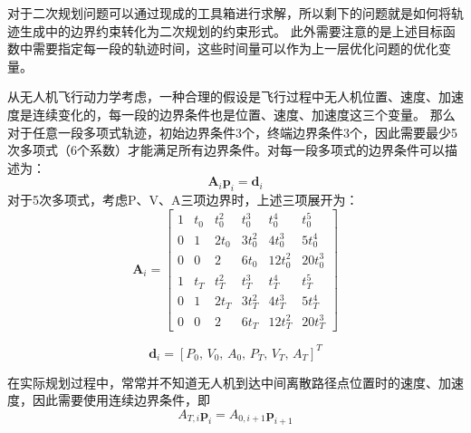 对于二次规划问题可以通过现成的工具箱进行求解，所以剩下的问题就是如何将轨迹生成中的边界约束转化为二次规划的约束形式。
{\color{red}此外需要注意的是上述目标函数中需要指定每一段的轨迹时间，这些时间量可以作为上一层优化问题的优化变量。}

从无人机飞行动力学考虑，一种合理的假设是飞行过程中无人机位置、速度、加速度是连续变化的，每一段的边界条件也是位置、速度、加速度这三个变量。
那么对于任意一段多项式轨迹，初始边界条件3个，终端边界条件3个，因此需要最少5次多项式（6个系数）才能满足所有边界条件。对每一段多项式的边界条件可以描述为：
\begin{equation}
    \bm{A}_i \bm{p}_i = \bm{d}_i
\end{equation}
对于5次多项式，考虑P、V、A三项边界时，上述三项展开为：
\begin{equation}
    \bm{A}_i = \begin{bmatrix}
        1   & t_0   & t_0^2     & t_0^3     & t_0^4     & t_0^5 \\
        0   & 1     & 2 t_0     & 3 t_0^2   & 4 t_0^3   & 5 t_0^4 \\
        0   & 0     & 2         & 6 t_0     & 12 t_0^2  & 20 t_0^3 \\
        1   & t_T   & t_T^2     & t_T^3     & t_T^4     & t_T^5 \\
        0   & 1     & 2 t_T     & 3 t_T^2   & 4 t_T^3   & 5 t_T^4 \\
        0   & 0     & 2         & 6 t_T     & 12 t_T^2  & 20 t_T^3 
    \end{bmatrix}
\end{equation}

\begin{equation}
    \bm{d}_i = [P_0, \, V_0, \, A_0, \, P_T, \, V_T, \, A_T]^T
\end{equation}

在实际规划过程中，常常并不知道无人机到达中间离散路径点位置时的速度、加速度，因此需要使用连续边界条件，即
\begin{equation}
    A_{T,i} \bm{p}_i = A_{0,i+1} \bm{p}_{i+1}
\end{equation}




